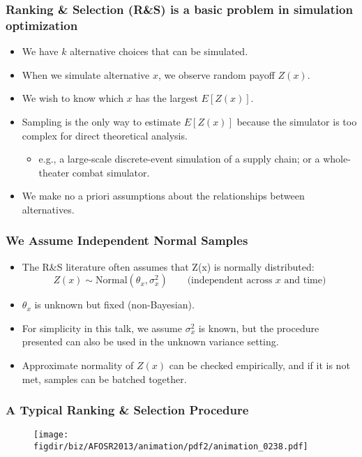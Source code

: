 \documentclass[13pt]{beamer}
\newcommand{\figdir}{../../fig}
\begin{document}
\begin{frame} \frametitle{Ranking \& Selection (R\&S) is a basic problem in simulation optimization}
\begin{itemize}
  \item We have $k$ alternative choices that can be simulated.
  \item When we simulate alternative $x$, we observe random payoff $Z(x)$.
  \item We wish to know which $x$ has the largest $E[Z(x)]$.
  \item Sampling is the only way to estimate $E[Z(x)]$ because the simulator is too complex for direct theoretical analysis.  
    \begin{itemize}
      \item e.g., a large-scale discrete-event simulation of a supply chain; or a whole-theater combat simulator.
    \end{itemize}
  \item We make no a priori assumptions about the relationships between alternatives.
\end{itemize}
\end{frame}

\begin{frame} \frametitle{We Assume Independent Normal Samples}
  \begin{itemize}
  \item The R\&S literature often assumes that Z(x) is normally distributed: 
    \begin{equation*}
      Z(x) \sim \mathrm{Normal}(\theta_x, \sigma^2_x) \qquad \text{(independent across $x$ and time)}
    \end{equation*}
  \item $\theta_x$ is unknown but fixed (non-Bayesian). 
  \item For simplicity in this talk, we assume $\sigma^2_x$ is known, but the procedure presented can also be used in the unknown variance setting.
  \item Approximate normality of $Z(x)$ can be checked empirically, and if it is not met, samples can be batched together.
\end{itemize}
\end{frame}


\begin{frame} \frametitle{A Typical Ranking \& Selection Procedure}
  \begin{figure}
    \center \texttt{[image: \\figdir/biz/AFOSR2013/animation/pdf2/animation\_0238.pdf]}
  \end{figure}
\end{frame}
\end{document}
